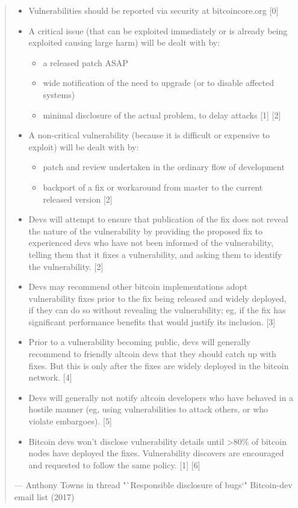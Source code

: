 \begin{quote}
\begin{itemize}
\item
  Vulnerabilities should be reported via security at bitcoincore.org
  {[}0{]}
\item
  A critical issue (that can be exploited immediately or is already
  being exploited causing large harm) will be dealt with by:

  \begin{itemize}
  \item
    a released patch ASAP
  \item
    wide notification of the need to upgrade (or to disable affected
    systems)
  \item
    minimal disclosure of the actual problem, to delay attacks {[}1{]}
    {[}2{]}
  \end{itemize}
\item
  A non-critical vulnerability (because it is difficult or expensive to
  exploit) will be dealt with by:

  \begin{itemize}
  \item
    patch and review undertaken in the ordinary flow of development
  \item
    backport of a fix or workaround from master to the current released
    version {[}2{]}
  \end{itemize}
\item
  Devs will attempt to ensure that publication of the fix does not
  reveal the nature of the vulnerability by providing the proposed fix
  to experienced devs who have not been informed of the vulnerability,
  telling them that it fixes a vulnerability, and asking them to
  identify the vulnerability. {[}2{]}
\item
  Devs may recommend other bitcoin implementations adopt vulnerability
  fixes prior to the fix being released and widely deployed, if they can
  do so without revealing the vulnerability; eg, if the fix has
  significant performance benefits that would justify its inclusion.
  {[}3{]}
\item
  Prior to a vulnerability becoming public, devs will generally
  recommend to friendly altcoin devs that they should catch up with
  fixes. But this is only after the fixes are widely deployed in the
  bitcoin network. {[}4{]}
\item
  Devs will generally not notify altcoin developers who have behaved in
  a hostile manner (eg, using vulnerabilities to attack others, or who
  violate embargoes). {[}5{]}
\item
  Bitcoin devs won't disclose vulnerability details until
  \textgreater80\% of bitcoin nodes have deployed the fixes.
  Vulnerability discovers are encouraged and requested to follow the
  same policy. {[}1{]} {[}6{]}
\end{itemize}

---  Anthony Towns in thread "`Responsible disclosure of bugs`"
Bitcoin-dev email list (2017)
\end{quote}

